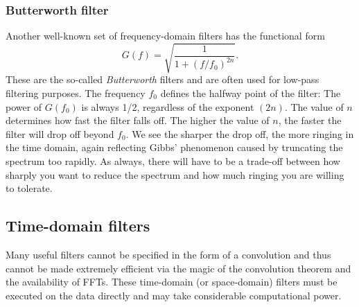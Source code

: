 \subsubsection{Butterworth filter}
	Another well-known set of frequency-domain filters has the functional form
\begin{equation}
G(f) = \sqrt{\frac{1}{1 + (f/f_0) ^{2n}} }.
\end{equation}
These are the so-called \emph{Butterworth} filters and are often used for low-pass filtering purposes.
The frequency $f_0$ defines the halfway point of the filter: The power of $G(f_0)$ is always 1/2,
regardless of the exponent $(2n)$. The value of $n$ determines how fast the filter falls off.
The higher the value of $n$, the faster the filter will drop off beyond $f_0$.
We see the sharper the drop off, the more ringing in the time domain, again reflecting Gibbs'
phenomenon caused by truncating the spectrum too rapidly. As always, there will have
to be a trade-off between how sharply you want to reduce the spectrum and how much
ringing you are willing to tolerate.\\

\subsection{Time-domain filters}
Many useful filters cannot be specified in the form of a convolution and thus cannot be made
extremely efficient via the magic of the convolution theorem and the availability of FFTs.  These time-domain (or space-domain)
filters must be executed on the data directly and may take considerable computational power.
